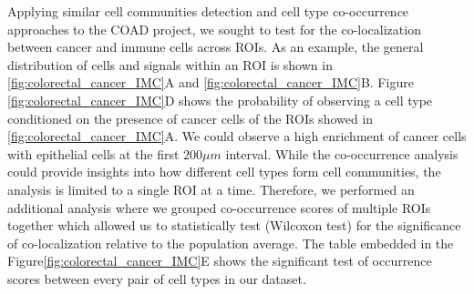 Applying similar cell communities detection and cell type co-occurrence approaches to the COAD project, we sought to test for the co-localization between cancer and immune cells across ROIs. As an example, the general distribution of cells and signals within an ROI is shown in \ref{fig:colorectal_cancer_IMC}A and \ref{fig:colorectal_cancer_IMC}B. Figure \ref{fig:colorectal_cancer_IMC}D shows the probability of observing a cell type conditioned on the presence of cancer cells of the ROIs showed in \ref{fig:colorectal_cancer_IMC}A. We could observe a high enrichment of cancer cells with epithelial cells at the first $200\mu m$ interval. While the co-occurrence analysis could provide insights into how different cell types form cell communities, the analysis is limited to a single ROI at a time. Therefore, we performed an additional analysis where we grouped co-occurrence scores of multiple ROIs together which allowed us to statistically test (Wilcoxon test) for the significance of co-localization relative to the population average. The table embedded in the Figure\ref{fig:colorectal_cancer_IMC}E shows the significant test of occurrence scores between every pair of cell types in our dataset. 

